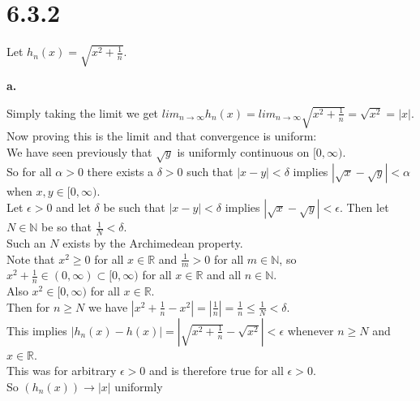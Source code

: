 \documentclass{article}
\begin{document}
\newpage
\section*{6.3.2}
\begin{center}
    \doublespacing
    Let $h_n (x) =\sqrt{x^2 +\frac{1}{n}}$.
\end{center}

{\Large\textbf{a.}}
\begin{center}
    \doublespacing
    Simply taking the limit we get $lim_{n\rightarrow\infty } h_n (x) = lim_{n\rightarrow\infty }\sqrt{x^2 +\frac{1}{n}} =\sqrt{x^2} =|x|$.
    \\Now proving this is the limit and that convergence is uniform:
    \\We have seen previously that $\sqrt{y}$ is uniformly continuous on $[0,\infty )$.
    \\So for all $\alpha > 0$ there exists a $\delta > 0$ such that $|x - y| <\delta$ implies $|\sqrt{x} -\sqrt{y}| <\alpha$ when $x, y\in [0,\infty )$.
    \\Let $\epsilon > 0$ and let $\delta$ be such that $|x - y| <\delta$ implies $|\sqrt{x} -\sqrt{y}| <\epsilon$. Then let $N\in\mathbb{N}$ be so that $\frac{1}{N} <\delta$.
    \\Such an $N$ exists by the Archimedean property.
    \\Note that $x^2\geq 0$ for all $x\in\mathbb{R}$ and $\frac{1}{m} > 0$ for all $m\in\mathbb{N}$, so $x^2 +\frac{1}{n}\in (0,\infty )\subset [0,\infty )$ for all $x\in\mathbb{R}$ and all $n\in\mathbb{N}$.
    \\Also $x^2\in [0,\infty )$ for all $x\in\mathbb{R}$.
    \\Then for $n\geq N$ we have $|x^2 +\frac{1}{n} - x^2| = |\frac{1}{n}| =\frac{1}{n}\leq\frac{1}{N} <\delta$.
    \\This implies $|h_n (x) - h(x)| = |\sqrt{x^2 +\frac{1}{n}} -\sqrt{x^2}| <\epsilon$ whenever $n\geq N$ and $x\in\mathbb{R}$.
    \\This was for arbitrary $\epsilon > 0$ and is therefore true for all $\epsilon > 0$.
    \\So $(h_n (x))\rightarrow |x|$ uniformly \qedsymbol
\end{center}
\end{document}
